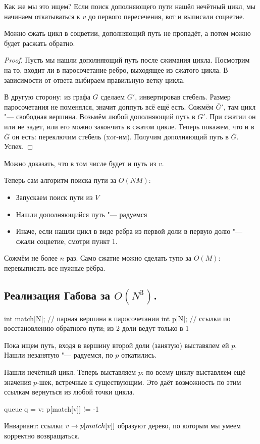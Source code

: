 Как же мы это ищем? Если поиск дополняющего пути нашёл нечётный цикл, мы начинаем откатываться к $v$ до первого пересечения, вот и выписали соцветие.

\begin{theorem}
Можно сжать цикл в соцветии, дополняющий путь не пропадёт, а потом можно будет расжать обратно.
\end{theorem}
\begin{proof}
	Пусть мы нашли дополняющий путь после сжимания цикла.
	Посмотрим на то, входит ли в паросочетание ребро, выходящее из сжатого цикла.
	В зависимости от ответа выбираем правильную ветку цикла.

	В другую сторону: из графа $G$ сделаем $G'$, инвертировав стебель.
	Размер паросочетания не поменялся, значит доппуть всё ещё есть.
	Сожмём $\bar G'$, там цикл "--- свободная вершина.
	Возьмём любой дополняющий путь в $G'$. При сжатии он или не задет, или его можно закончить в сжатом цикле.
	Теперь покажем, что и в $\bar G$ он есть: переключим стебель (xor-им).
	Получим дополняющий путь в $\bar G$. Успех.
\end{proof}
Можно доказать, что в том числе будет и путь из $v$.

Теперь сам алгоритм поиска пути за $O(NM)$:
\begin{itemize}
	\item Запускаем поиск пути из $V$
	\item Нашли дополняющийся путь "--- радуемся
	\item Иначе, если нашли цикл в виде ребра из первой доли в первую долю "--- сжали соцветие, смотри пункт 1.
\end{itemize}
Сожмём не более $n$ раз. Само сжатие можно сделать тупо за $O(M)$: перевыписать все нужные рёбра.

\subsection{Реализация Габова за \texorpdfstring{$O(N^3)$}{O(N\textasciicircum3)}.}
\begin{abstractcode}
int match[N]; // парная вершина в паросочетании
int p[N]; // ссылки по восстановлению обратного пути; из 2 доли ведут только в 1
\end{abstractcode}
Пока ищем путь, входя в вершину второй доли (занятую) выставялем ей $p$.
Нашли незанятую "--- радуемся, по $p$ откатились.

Нашли нечётный цикл. Теперь выставляем $p$: по всему циклу выставляем ещё значения $p$-шек, встречные к существующим.
Это даёт возможность по этим ссылкам вернуться из любой точки цикла.
\begin{abstractcode}
queue q = { v:  p[match[v]] != -1 }
\end{abstractcode}
Инвариант: ссылки $v \rightarrow p[match[v]]$ образуют дерево, по которым мы умеем корректно возвращаться.

